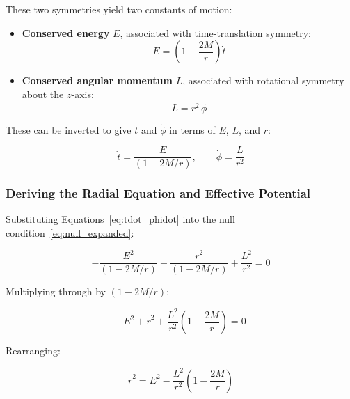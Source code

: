 \documentclass[12pt,a4paper]{article}
\begin{document}
These two symmetries yield two constants of motion:

\begin{itemize}
    \item \textbf{Conserved energy} $E$, associated with time-translation
    symmetry:
    \begin{equation}
        E = \left(1 - \frac{2M}{r}\right)\dot{t}
        \label{eq:conserved_energy}
    \end{equation}

    \item \textbf{Conserved angular momentum} $L$, associated with
    rotational symmetry about the $z$-axis:
    \begin{equation}
        L = r^2\,\dot{\phi}
        \label{eq:conserved_angmom}
    \end{equation}
\end{itemize}

\noindent These can be inverted to give $\dot{t}$ and $\dot{\phi}$ in terms of $E$, $L$, and $r$:

\begin{equation}
    \dot{t} = \frac{E}{\left(1 - 2M/r\right)},
    \qquad
    \dot{\phi} = \frac{L}{r^2}
    \label{eq:tdot_phidot}
\end{equation}

\subsubsection{Deriving the Radial Equation and Effective Potential}
Substituting Equations~\eqref{eq:tdot_phidot} into the null condition~\eqref{eq:null_expanded}:

\begin{equation}
    -\frac{E^2}{\left(1 - 2M/r\right)}
    + \frac{\dot{r}^2}{\left(1 - 2M/r\right)}
    + \frac{L^2}{r^2} = 0
\end{equation}

Multiplying through by $\left(1 - 2M/r\right)$:

\begin{equation}
    -E^2 + \dot{r}^2 + \frac{L^2}{r^2}\left(1 - \frac{2M}{r}\right) = 0
\end{equation}

Rearranging:

\begin{equation}
    \dot{r}^2 = E^2 - \frac{L^2}{r^2}\left(1 - \frac{2M}{r}\right)
    \label{eq:rdot_squared}
\end{equation}
\end{document}
